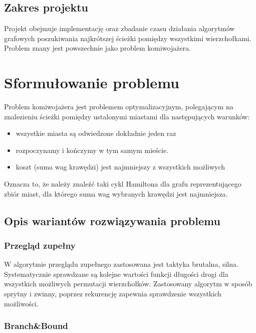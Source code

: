 \documentclass{article}
\begin{document}
	\subsection {Zakres projektu}
	Projekt obejmuje implementację oraz zbadanie czasu działania algorytmów grafowych poszukiwania najkrótszej ścieżki pomiędzy wszystkimi wierzchołkami. Problem znany jest powszechnie jako problem komiwojażera.
\section{Sformułowanie problemu}
		Problem komiwojażera jest problemem optymalizacyjnym, polegającym na znalezieniu ścieżki pomiędzy ustalonymi miastami dla następujących warunków: 
		\begin{itemize}
			\item wszystkie miasta są odwiedzone dokładnie jeden raz
			\item rozpoczynamy i kończymy w tym samym mieście.
			\item koszt (suma wag krawędzi) jest najmniejszy z wszystkich możliwych
		\end{itemize}
		Oznacza to, że należy znaleźć taki cykl Hamiltona dla grafu reprezentującego zbiór miast, dla którego suma wag wybranych krawędzi jest najmniejsza.
		
	\subsection{Opis wariantów rozwiązywania problemu}	
		\subsubsection{Przegląd zupełny}
				W algorytmie przeglądu zupełnego zastosowana jest taktyka brutalna, silna. Systematycznie sprawdzane są kolejne wartości funkcji długości drogi dla wszystkich możliwych permutacji wierzchołków. Zastosowany algorytm w sposób sprytny i zwinny, poprzez rekurencję zapewnia sprawdzenie wszystkich możliwości.
		\subsubsection{Branch\&Bound}
			
\end{document}
